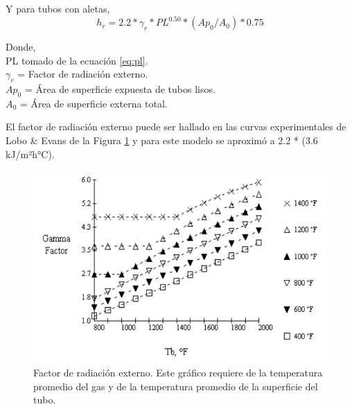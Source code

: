 \par Y para tubos con aletas,
\begin{equation}
h_r = 2.2 *\gamma_r *PL^{0.50} *(Ap_0/A_0) *0.75
\end{equation}

\par Donde,\\
PL tomado de la ecuación \ref{eq:pl}.\\
$\gamma_r$ = Factor de radiación externo.\\
$Ap_0$ = Área de superficie expuesta de tubos lisos.\\
$A_0$ = Área de superficie externa total. \\
\par El factor de radiación externo puede ser hallado en las curvas experimentales de Lobo \& Evans de la Figura \ref{fig:gamma} y para este modelo se aproximó a 2.2 * (3.6 kJ/m²h°C).
\begin{figure}[H]
\begin{center}
\includegraphics[scale=0.40]{images/gamma}
\caption[Factor de radiación externo]{Factor de radiación externo. Este gráfico requiere de la temperatura promedio del gas y de la temperatura promedio de la superficie del tubo.\cite{bib:rad}}
\label{fig:gamma}
\end{center}
\end{figure}

